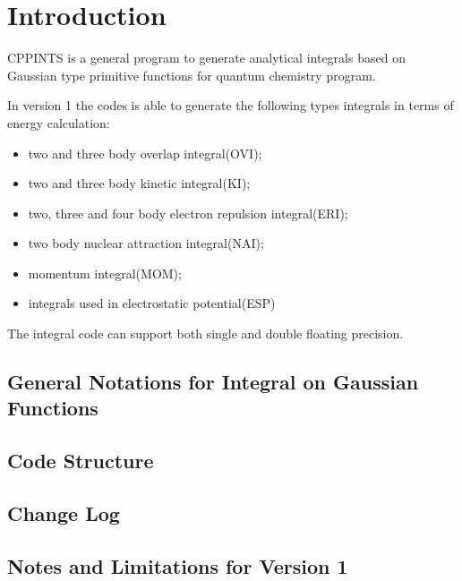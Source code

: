 %
% 
%
\chapter{Introduction}

CPPINTS is a general program to generate analytical integrals based on Gaussian type primitive 
functions for quantum chemistry program.

In version 1 the codes is able to generate the following types integrals in terms of energy 
calculation:
\begin{itemize}
 \item two and three body overlap integral(OVI);
 \item two and three body kinetic integral(KI);
 \item two, three and four body electron repulsion integral(ERI);
 \item two body nuclear attraction integral(NAI);
 \item momentum integral(MOM);
 \item integrals used in electrostatic potential(ESP)
\end{itemize}

The integral code can support both single and double floating precision.

\section{General Notations for Integral on Gaussian Functions}

\section{Code Structure}

\section{Change Log}

\section{Notes and Limitations for Version 1}

